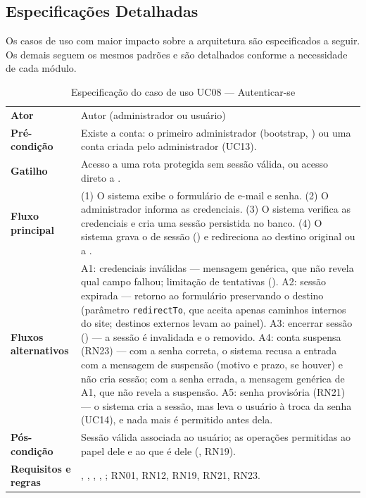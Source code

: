 \subsection{Especificações Detalhadas}\label{sec:uc-detalhados}

Os casos de uso com maior impacto sobre a arquitetura são especificados a seguir. Os demais seguem os mesmos padrões e são detalhados conforme a necessidade de cada módulo.

\begin{table}[htb]
\caption{Especificação do caso de uso UC08 --- Autenticar-se}\label{tab:uc08}
\small
\begin{tabularx}{\linewidth}{@{}L{3.0cm}Y@{}}
\toprule
\textbf{Ator} & Autor (administrador ou usuário)\\
\textbf{Pré-condição} & Existe a conta: o primeiro administrador (bootstrap, ) ou uma conta criada pelo administrador (UC13).\\
\textbf{Gatilho} & Acesso a uma rota protegida sem sessão válida, ou acesso direto a .\\
\textbf{Fluxo principal} & (1) O sistema exibe o formulário de e-mail e senha. (2) O administrador informa as credenciais. (3) O sistema verifica as credenciais e cria uma sessão persistida no banco. (4) O sistema grava o  de sessão () e redireciona ao destino original ou a .\\
\textbf{Fluxos alternativos} & A1: credenciais inválidas --- mensagem genérica, que não revela qual campo falhou; limitação de tentativas (). A2: sessão expirada --- retorno ao formulário preservando o destino (parâmetro \texttt{redirectTo}, que aceita apenas caminhos internos do site; destinos externos levam ao painel). A3: encerrar sessão () --- a sessão é invalidada e o  removido. A4: conta suspensa (RN23) --- com a senha correta, o sistema recusa a entrada com a mensagem de suspensão (motivo e prazo, se houver) e não cria sessão; com a senha errada, a mensagem genérica de A1, que não revela a suspensão. A5: senha provisória (RN21) --- o sistema cria a sessão, mas leva o usuário à troca da senha (UC14), e nada mais é permitido antes dela.\\
\textbf{Pós-condição} & Sessão válida associada ao usuário; as operações permitidas ao papel dele e ao que é dele (, RN19).\\
\textbf{Requisitos e regras} & , , , , ; RN01, RN12, RN19, RN21, RN23.\\
\bottomrule
\end{tabularx}
\end{table}

